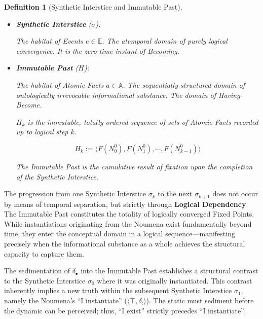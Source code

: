 \documentclass[11pt, a4paper]{article}
\theoremstyle{formalism}
\newtheorem{formalism}{Definition}
\begin{document}
\begin{formalism}[Synthetic Interstice and Immutable Past]

    \begin{itemize}
        \item \textbf{Synthetic Interstice} ($\sigma$): 
 
        The habitat of Events $e \in \mathbb{E}$. The atemporal domain of 
        purely logical convergence. It is the zero-time instant of \textit{Becoming}.
        
        \item \textbf{Immutable Past} ($H$): 

        The habitat of Atomic Facts $a \in \mathbb{A}$. The sequentially structured
        domain of ontologically irrevocable informational substance. The domain
        of \textit{Having-Become}.

        $H_k$ is the immutable, totally ordered sequence of sets of Atomic Facts 
        recorded up to logical step $k$.

        \begin{equation}
            H_k := \langle \mathit{F}(N^0_0), \mathit{F}(N^0_1), \cdots, \mathit{F}(N^0_{k-1}) \rangle
        \end{equation}

        The Immutable Past is the cumulative result of fixation upon the completion
        of the Synthetic Interstice.
    \end{itemize}

\end{formalism}

The progression from one Synthetic Interstice $\sigma_k$ to the next
$\sigma_{k+1}$ does not occur by means of temporal separation, but strictly
through \textbf{Logical Dependency}. The Immutable Past constitutes the totality
of logically converged Fixed Points. While instantiations originating from the
Noumena exist fundamentally beyond time, they enter the conceptual domain in a
logical sequence---manifesting precisely when the informational substance as a
whole achieves the structural capacity to capture them.

The sedimentation of $\delta_\bullet$ into the Immutable Past establishes a
structural contrast to the Synthetic Interstice $\sigma_0$ where it
was originally instantiated. This contrast inherently implies a new truth
within the subsequent Synthetic Interstice $\sigma_1$, namely the Noumena's
``I instantiate'' ($\langle \top, \delta_{:} \rangle$). The static must
sediment before the dynamic can be perceived; thus, ``I exist'' strictly
precedes ``I instantiate''.
\end{document}
